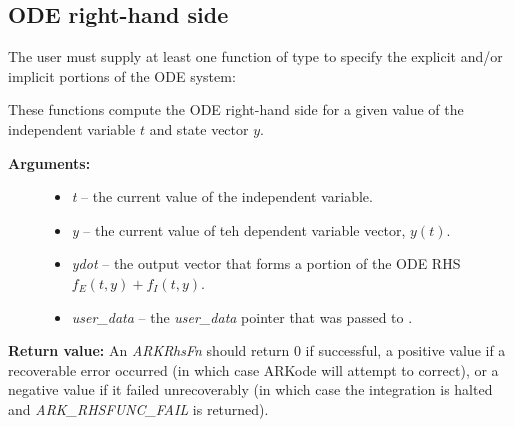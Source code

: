 \documentclass[letterpaper,10pt,english]{sphinxmanual}
\begin{document}
\subsection{ODE right-hand side}
\label{c_interface/User_supplied:ode-right-hand-side}\label{c_interface/User_supplied:cinterface-oderhs}
The user must supply at least one function of type {\hyperref[c_interface/User_supplied:ARKRhsFn]{}} to
specify the explicit and/or implicit portions of the ODE system:

\begin{fulllineitems}
\label{c_interface/User_supplied:ARKRhsFn}
These functions compute the ODE right-hand side for a given
value of the independent variable $t$ and state vector $y$.
\begin{description}
\item[{\textbf{Arguments:}}] \leavevmode\begin{itemize}
\item {} 
\emph{t} -- the current value of the independent variable.

\item {} 
\emph{y} -- the current value of teh dependent variable vector, $y(t)$.

\item {} 
\emph{ydot} -- the output vector that forms a portion of the ODE RHS $f_E(t,y) + f_I(t,y)$.

\item {} 
\emph{user\_data} -- the \emph{user\_data} pointer that was passed to {\hyperref[c_interface/User_callable:ARKodeSetUserData]{}}.

\end{itemize}

\end{description}

\textbf{Return value:}
An \emph{ARKRhsFn} should return 0 if successful, a positive value if a
recoverable error occurred (in which case ARKode will attempt to
correct), or a negative value if it failed unrecoverably (in which
case the integration is halted and \emph{ARK\_RHSFUNC\_FAIL} is returned).


\end{fulllineitems}
\end{document}
